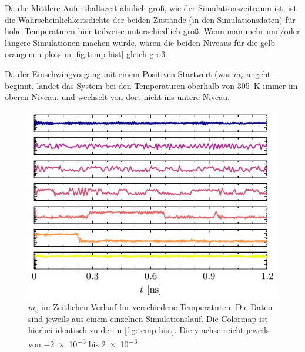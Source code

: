 \documentclass[main.tex]{subfiles}
\begin{document}
Da die Mittlere Aufenthaltszeit ähnlich groß, wie der Simulationszeitraum ist, ist die Wahrscheinlichkeitsdichte der beiden Zustände (in den Simulationsdaten) für hohe Temperaturen hier teilweise unterschiedlich groß. Wenn man mehr und/oder längere Simulationen machen würde, wären die beiden Niveaus für die gelb-orangenen plots in \cref{fig:temp-hist} gleich groß.

Da der Einschwingvorgang mit einem Positiven Startwert (was \(m_c\) angeht beginnt, landet das System bei den Temperaturen oberhalb von \SI{305}{\kelvin} immer im oberen Niveau. und wechselt von dort nicht ins untere Niveau. 

\begin{figure}[H]
    \centering
    \includegraphics{bilder/plots/temp_comparison_long/mc_time.pdf}
    \caption{\(m_c\) im Zeitlichen Verlauf für verschiedene Temperaturen. Die Daten sind jeweils aus einem einzelnen Simulationslauf. Die Colormap ist hierbei identisch zu der in \cref{fig:temp-hist}. Die y-achse reicht jeweils von \num{-2e-3} bis \num{+2e-3}}\label{fig:temp-time}
\end{figure}
\end{document}
